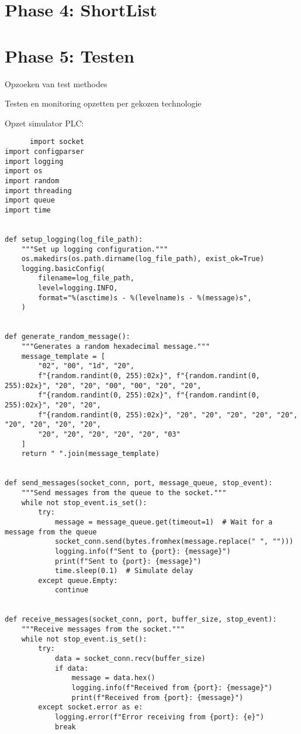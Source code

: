 \section{Phase 4: ShortList}

\section{Phase 5: Testen}
Opzoeken van test methodes 

Testen en monitoring opzetten per gekozen technologie

Opzet simulator PLC:
\begin{listing}[h!]
    \begin{verbatim}
      import socket
import configparser
import logging
import os
import random
import threading
import queue
import time


def setup_logging(log_file_path):
    """Set up logging configuration."""
    os.makedirs(os.path.dirname(log_file_path), exist_ok=True)
    logging.basicConfig(
        filename=log_file_path,
        level=logging.INFO,
        format="%(asctime)s - %(levelname)s - %(message)s",
    )


def generate_random_message():
    """Generates a random hexadecimal message."""
    message_template = [
        "02", "00", "1d", "20",
        f"{random.randint(0, 255):02x}", f"{random.randint(0, 255):02x}", "20", "20", "00", "00", "20", "20",
        f"{random.randint(0, 255):02x}", f"{random.randint(0, 255):02x}", "20", "20",
        f"{random.randint(0, 255):02x}", "20", "20", "20", "20", "20", "20", "20", "20", "20",
        "20", "20", "20", "20", "20", "03"
    ]
    return " ".join(message_template)


def send_messages(socket_conn, port, message_queue, stop_event):
    """Send messages from the queue to the socket."""
    while not stop_event.is_set():
        try:
            message = message_queue.get(timeout=1)  # Wait for a message from the queue
            socket_conn.send(bytes.fromhex(message.replace(" ", "")))
            logging.info(f"Sent to {port}: {message}")
            print(f"Sent to {port}: {message}")
            time.sleep(0.1)  # Simulate delay
        except queue.Empty:
            continue   


def receive_messages(socket_conn, port, buffer_size, stop_event):
    """Receive messages from the socket."""
    while not stop_event.is_set():
        try:
            data = socket_conn.recv(buffer_size)
            if data:
                message = data.hex()
                logging.info(f"Received from {port}: {message}")
                print(f"Received from {port}: {message}")
        except socket.error as e:
            logging.error(f"Error receiving from {port}: {e}")
            break



\end{verbatim}
\end{listing}
